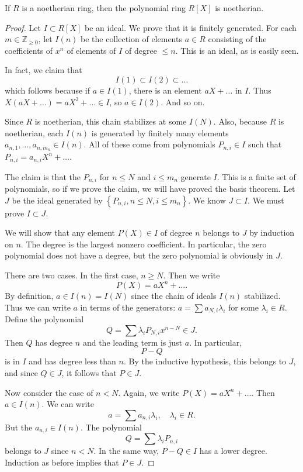 \begin{theorem}\label{hilbbasis}
If $R$ is a noetherian ring, then the polynomial ring $R[X]$ is noetherian.
\end{theorem} 
\begin{proof} 
Let $I \subset R[X]$ be an ideal. We prove that it is finitely generated. For
each $m \in \mathbb{Z}_{\geq 0}$, let $I(n)$ be the collection of elements 
$ a\in R$ consisting of the coefficients of $x^n$ of elements of $I$ of degree
$\leq n$.
This is an ideal, as is easily seen.

In fact, we claim that
\[ I(1) \subset I(2) \subset \dots  \]
which follows because if $ a\in I(1)$, there is an element $aX + \dots$ in $I$.
Thus $X(aX + \dots) = aX^2 + \dots \in I$, so $a \in I(2)$. And so on.

Since $R$ is noetherian, this chain stabilizes at some $I(N). $
Also, because $R$ is noetherian, each $I(n)$ is generated by finitely many
elements $a_{n,1}, \dots, a_{n, m_n} \in I(n)$. All of these come from polynomials
$P_{n,i} \in I$ such that $P_{n,i} = a_{n,i} X^n + \dots$.

The claim is that the $P_{n,i}$ for $n \leq N$ and $i \leq m_n$ generate $I$. 
This is a finite set of polynomials, so if we prove the claim, we will have
proved the basis theorem. Let $J$ be the ideal generated by
$\left\{P_{n,i}, n \leq N, i \leq m_n \right\}$. We know $J \subset I$. We must
prove $I \subset J$.

We will show that any element $P(X) \in I$ of degree $n$ belongs to $J$ by
induction on $n$. The degree is the largest nonzero coefficient. In particular,
the zero polynomial does not have a degree, but the zero polynomial is
obviously in $J$.

There are two cases. In the first case, $n \geq N$. Then we write
\[ P(X) = a X^n + \dots .  \] By definition, $a \in I(n) = I(N)$ since the
chain of ideals $I(n)$ stabilized. Thus we can write $a$ in terms of the
generators:  $a = \sum a_{N, i} \lambda_i$ for some
$\lambda_i \in R$. Define the polynomial
\[ Q = \sum \lambda_i P_{N, i} x^{n-N} \in J.  \] Then $Q$ has degree $n$ and
the leading term is just $a$.  In particular, 
\[ P - Q  \]
is in $I$ and has degree less than $n$. By the inductive hypothesis, this
belongs to $J$, and since $Q \in J$, it follows that $P \in J$. 

Now consider the case of $n < N$. 
Again, we write $P(X) = a X^n + \dots$. Then $a \in I(n)$.  We can write 
\[ a = \sum a_{n,i} \lambda_i, \quad \lambda_i \in R.  \]
But the $a_{n,i} \in I(n)$. The polynomial
\[ Q = \sum \lambda_i P_{n,i}   \]
belongs to $J$ since $n  < N$. In the same way, $P-Q \in I$ has a lower degree.
Induction as before implies that $P \in J$. 
\end{proof} 


